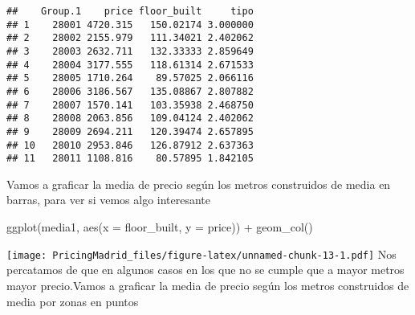 \documentclass[
]{article}
\newenvironment{Shaded}{\begin{snugshade}}{\end{snugshade}}
\newcommand{\AttributeTok}[1]{\textcolor[rgb]{0.77,0.63,0.00}{#1}}
\newcommand{\CommentTok}[1]{\textcolor[rgb]{0.56,0.35,0.01}{\textit{#1}}}
\newcommand{\DecValTok}[1]{\textcolor[rgb]{0.00,0.00,0.81}{#1}}
\newcommand{\FloatTok}[1]{\textcolor[rgb]{0.00,0.00,0.81}{#1}}
\newcommand{\FunctionTok}[1]{\textcolor[rgb]{0.00,0.00,0.00}{#1}}
\newcommand{\NormalTok}[1]{#1}
\newcommand{\OtherTok}[1]{\textcolor[rgb]{0.56,0.35,0.01}{#1}}
\newcommand{\SpecialCharTok}[1]{\textcolor[rgb]{0.00,0.00,0.00}{#1}}
\begin{document}
\begin{Shaded}
\end{Shaded}

\begin{verbatim}
##    Group.1    price floor_built     tipo
## 1    28001 4720.315   150.02174 3.000000
## 2    28002 2155.979   111.34021 2.402062
## 3    28003 2632.711   132.33333 2.859649
## 4    28004 3177.555   118.61314 2.671533
## 5    28005 1710.264    89.57025 2.066116
## 6    28006 3186.567   135.08867 2.807882
## 7    28007 1570.141   103.35938 2.468750
## 8    28008 2063.856   109.04124 2.402062
## 9    28009 2694.211   120.39474 2.657895
## 10   28010 2953.846   126.87912 2.637363
## 11   28011 1108.816    80.57895 1.842105
\end{verbatim}

Vamos a graficar la media de precio según los metros construidos de
media en barras, para ver si vemos algo interesante

\begin{Shaded}
\begin{Highlighting}[]
\FunctionTok{ggplot}\NormalTok{(media1, }\FunctionTok{aes}\NormalTok{(}\AttributeTok{x =}\NormalTok{ floor\_built, }\AttributeTok{y =}\NormalTok{ price)) }\SpecialCharTok{+}
        \FunctionTok{geom\_col}\NormalTok{()}
\end{Highlighting}
\end{Shaded}

\texttt{[image: PricingMadrid\_files/figure-latex/unnamed-chunk-13-1.pdf]}
Nos percatamos de que en algunos casos en los que no se cumple que a
mayor metros mayor precio.Vamos a graficar la media de precio según los
metros construidos de media por zonas en puntos

\begin{Shaded}
\end{Shaded}
\end{document}
